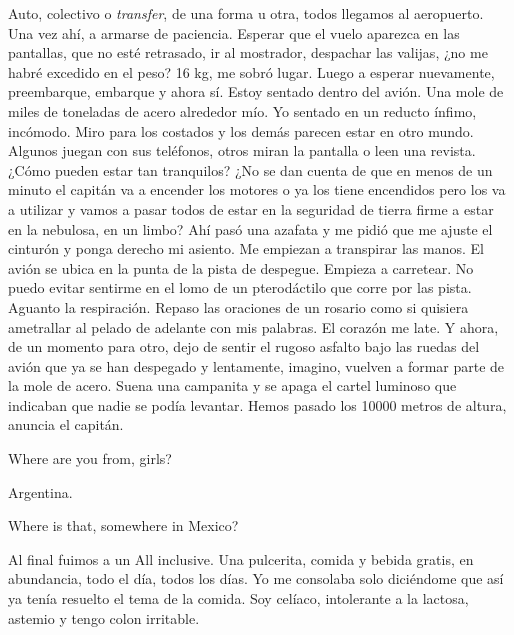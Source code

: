 \documentclass[12pt,twoside,openright,a5paper]{book}
\begin{document}
Auto, colectivo o \emph{transfer}, de una forma u otra, todos llegamos al
aeropuerto. Una vez ahí, a armarse de paciencia. Esperar que el vuelo
aparezca en las pantallas, que no esté retrasado, ir al mostrador,
despachar las valijas, ¿no me habré excedido en el peso? 16 kg, me sobró
lugar. Luego a esperar nuevamente, preembarque, embarque y ahora sí. Estoy
sentado dentro del avión. Una mole de miles de toneladas de acero alrededor
mío. Yo sentado en un reducto ínfimo, incómodo. Miro para los costados y
los demás parecen estar en otro mundo. Algunos juegan con sus teléfonos,
otros miran la pantalla o leen una revista. ¿Cómo pueden estar tan
tranquilos? ¿No se dan cuenta de que en menos de un minuto el capitán va
a encender los motores o ya los tiene encendidos pero los va a utilizar y
vamos a pasar todos de estar en la seguridad de tierra firme a estar en la
nebulosa, en un limbo? Ahí pasó una azafata y me pidió que me ajuste el
cinturón y ponga derecho mi asiento. Me empiezan a transpirar las manos. El
avión se ubica en la punta de la pista de despegue. Empieza a carretear. No
puedo evitar sentirme en el lomo de un pterodáctilo que corre por las
pista. Aguanto la respiración. Repaso las oraciones de un rosario como si
quisiera ametrallar al pelado de adelante con mis palabras. El corazón me
late. Y ahora, de un momento para otro, dejo de sentir el rugoso asfalto
bajo las ruedas del avión que ya se han despegado y lentamente, imagino,
vuelven a formar parte de la mole de acero. Suena una campanita y se apaga
el cartel luminoso que indicaban que nadie se podía levantar. Hemos pasado
los 10000 metros de altura, anuncia el capitán.


\vspace{0.5cm}
\hrulefill\hspace{0.2cm} \decofourleft\decofourright \hspace{0.2cm} \hrulefill
\vspace{0.5cm}

Where are you from, girls?

Argentina.

Where is that, somewhere in Mexico?


\vspace{0.5cm}
\hrulefill\hspace{0.2cm} \decofourleft\decofourright \hspace{0.2cm} \hrulefill
\vspace{0.5cm}

Al final fuimos a un All inclusive. Una pulcerita, comida y bebida gratis, en
abundancia, todo el día, todos los días. Yo me consolaba solo diciéndome
que así ya tenía resuelto el tema de la comida. Soy celíaco, intolerante
a la lactosa, astemio y tengo colon irritable.
\end{document}
